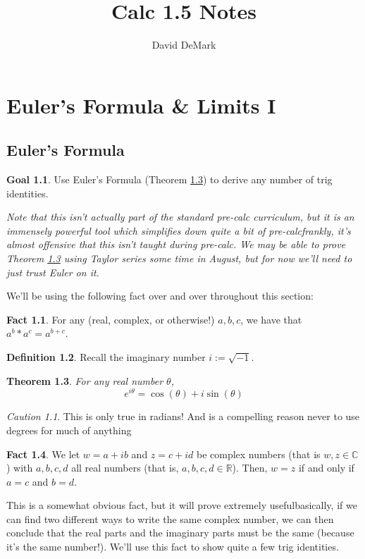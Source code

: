 \documentclass[english]{book}
\title{Calc 1.5 Notes}
\author{David DeMark}
\date{\due}
\newcommand{\RR}{\mathbb{R}}
\newcommand{\CC}{\mathbb{C}}
\newtheorem{theorem}{Theorem}[section]
\theoremstyle{remark}
\newtheorem{caution}{Caution}[theorem]
\theoremstyle{definition}
\newtheorem{definition}[theorem]{Definition}
\newtheorem*{goal}{Goal}
\newtheorem*{next week}{Next Week}
\newtheorem{fact}[theorem]{Fact}
\begin{document}
\maketitle
\chapter{Euler's Formula \& Limits I}
\setcounter{section}{-1}
\section{Euler's Formula}
\begin{goal} Use Euler's Formula (Theorem \ref{thm:eufl}) to derive any number of trig identities.
	\end{goal}
\emph{Note that this isn't actually part of the standard pre-calc curriculum, but it is an immensely powerful tool which simplifies down quite a bit of pre-calc\textemdash frankly, it's almost offensive that this isn't taught during pre-calc. We may be able to prove Theorem \ref{thm:eufl} using Taylor series some time in August, but for now we'll need to just trust Euler on it.}

We'll be using the following fact over and over throughout this section:
\begin{fact}
	For any (real, complex, or otherwise!) $a,b,c$, we have that $a^b*a^c=a^{b+c}$.
\end{fact}

\begin{definition}
	Recall the imaginary number $i:=\sqrt{-1}$. 
\end{definition}

\begin{theorem}
\label{thm:eufl} For any real number $\theta$, $$e^{i\theta}=\cos(\theta)+i\sin(\theta)$$
\end{theorem}
\begin{caution}
	This is only true in radians! And is a compelling reason never to use degrees for much of anything\textellipsis
\end{caution}
\begin{fact}\label{fact:cplx=}
	We let $w=a+ib$ and $z=c+id$ be complex numbers (that is $w,z\in \CC$) with $a,b,c,d$ all real numbers (that is, $a,b,c,d\in \RR$). Then, $w=z$ if and only if $a=c$ and $b=d$.
\end{fact}

This is a somewhat obvious fact, but it will prove extremely useful\textemdash basically, if we can find two different ways to write the same complex number, we can then conclude that the real parts and the imaginary parts must be the same (because it's the same number!). We'll use this fact to show quite a few trig identities.
\end{document}
